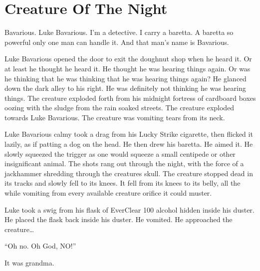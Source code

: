 \chapter{Creature Of The Night}




Bavarious. Luke Bavarious. I'm a detective. I carry a baretta. A
baretta so powerful only one man can handle it. And that man's name
is Bavarious.



Luke Bavarious opened the door to exit the doughnut shop when he
heard it. Or at least he thought he heard it. He thought he was
hearing things again. Or was he thinking that he was thinking that
he was hearing things again? He glanced down the dark alley to his
right. He was definitely not thinking he was hearing things. The
creature exploded forth from his midnight fortress of cardboard
boxes oozing with the sludge from the rain soaked streets. The
creature exploded towards Luke Bavarious. The creature was vomiting
tears from its neck.



Luke Bavarious calmy took a drag from his Lucky Strike cigarette,
then flicked it lazily, as if patting a dog on the head. He then
drew his baretta. He aimed it. He slowly squeezed the trigger as
one would squeeze a small centipede or other insignificant animal.
The shots rang out through the night, with the force of a
jackhammer shredding through the creatures skull. The creature
stopped dead in its tracks and slowly fell to its knees. It fell
from its knees to its belly, all the while vomiting from every
available creature orifice it could muster.



Luke took a swig from his flask of EverClear 100%
alcohol hidden inside his duster. He placed the flask back inside
his duster. He vomited. He approached the creature{\ldots}



``Oh no. Oh God, NO!''



It was grandma. 
 






